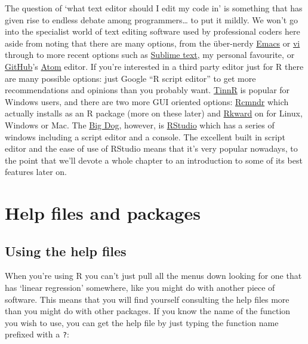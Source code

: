 \documentclass[
]{book}
\begin{document}
The question of `what text editor should I edit my code in' is something that has given rise to endless debate among programmers\ldots{} to put it mildly. We won't go into the specialist world of text editing software used by professional coders here aside from noting that there are many options, from the über-nerdy \href{http://www.gnu.org/software/emacs/}{Emacs} or \href{http://ex-vi.sourceforge.net/}{vi} through to more recent options such as \href{https://www.sublimetext.com/}{Sublime text}, my personal favourite, or \href{https://github.com/}{GitHub}'s \href{https://atom.io/}{Atom} editor. If you're interested in a third party editor just for R there are many possible options: just Google ``R script editor'' to get more recommendations and opinions than you probably want. \href{http://sourceforge.net/projects/tinn-r/}{TinnR} is popular for Windows users, and there are two more GUI oriented options: \href{https://socialsciences.mcmaster.ca/jfox/Misc/Rcmdr/}{Rcmndr} which actually installs as an R package (more on these later) and \href{https://rkward.kde.org/}{Rkward} on for Linux, Windows or Mac. The \href{https://www.urbandictionary.com/define.php?term=Big\%20Dog}{Big Dog}, however, is \href{https://www.rstudio.com}{RStudio} which has a series of windows including a script editor and a console. The excellent built in script editor and the ease of use of RStudio means that it's very popular nowadays, to the point that we'll devote a whole chapter to an introduction to some of its best features later on.

\hypertarget{help-files-and-packages}{%
\chapter{Help files and packages}\label{help-files-and-packages}}

\hypertarget{using-the-help-files}{%
\section{Using the help files}\label{using-the-help-files}}

When you're using R you can't just pull all the menus down looking for one that has `linear regression' somewhere, like you might do with another piece of software. This means that you will find yourself consulting the help files more than you might do with other packages.
If you know the name of the function you wish to use, you can get the help file by just typing the function name prefixed with a \texttt{?}:
\end{document}
